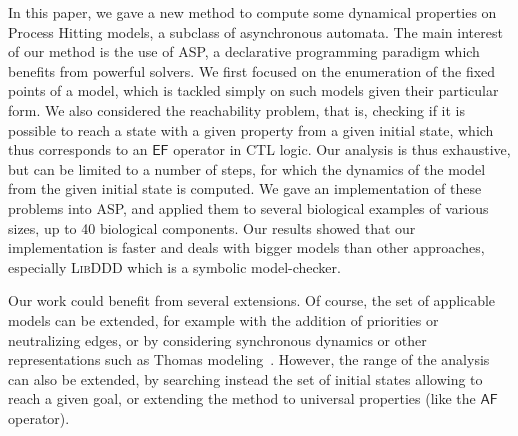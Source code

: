 In this paper, we gave a new method to compute some dynamical properties
on Process Hitting models, a subclass of asynchronous automata.
The main interest of our method is the use of ASP,
a declarative programming paradigm which benefits from powerful solvers.
We first focused on the enumeration of the fixed points of a model,
which is tackled simply on such models given their particular form.
We also considered the reachability problem, that is,
checking if it is possible to reach a state with a given property
from a given initial state,
which thus corresponds to an $\mathsf{EF}$ operator in CTL logic.
Our analysis is thus exhaustive, but can be limited to a number of steps,
for which the dynamics of the model from the given initial state is computed.
We gave an implementation of these problems into ASP,
and applied them to several biological examples of various sizes, up to
40 biological components.
Our results showed that our implementation is faster and deals with bigger models
than other approaches, especially \textsc{LibDDD} which is a symbolic model-checker.

Our work could benefit from several extensions.
Of course, the set of applicable models can be extended,
for example with the addition
of priorities or neutralizing edges,
or by considering synchronous dynamics or other representations
such as Thomas modeling~\cite{BernotSemBRN}.
However, the range of the analysis can also be extended,
by searching instead the set of initial states
allowing to reach a given goal,
or extending the method to universal properties (like the $\mathsf{AF}$ operator).
